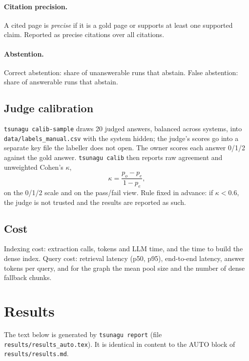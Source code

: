 \documentclass[11pt,a4paper]{article}
\newcommand{\code}[1]{\texttt{#1}}
\begin{document}
\paragraph{Citation precision.} A cited page is \emph{precise} if it is a gold page or supports at
least one supported claim. Reported as precise citations over all citations.

\paragraph{Abstention.} Correct abstention: share of unanswerable runs that abstain. False
abstention: share of answerable runs that abstain.

\subsection{Judge calibration}

\code{tsunagu calib-sample} draws 20 judged answers, balanced across systems, into
\code{data/labels\_manual.csv} with the system hidden; the judge's scores go into a separate key
file the labeller does not open. The owner scores each answer 0/1/2 against the gold answer.
\code{tsunagu calib} then reports raw agreement and unweighted Cohen's $\kappa$,
\[
  \kappa = \frac{p_o - p_e}{1 - p_e},
\]
on the 0/1/2 scale and on the pass/fail view. Rule fixed in advance: if $\kappa < 0.6$, the judge
is not trusted and the results are reported as such.

\subsection{Cost}

Indexing cost: extraction calls, tokens and LLM time, and the time to build the dense index.
Query cost: retrieval latency (p50, p95), end-to-end latency, answer tokens per query, and for the
graph the mean pool size and the number of dense fallback chunks.

\section{Results}
\label{sec:results}

The text below is generated by \code{tsunagu report} (file \code{results/results\_auto.tex}).
It is identical in content to the AUTO block of \code{results/results.md}.
\end{document}

